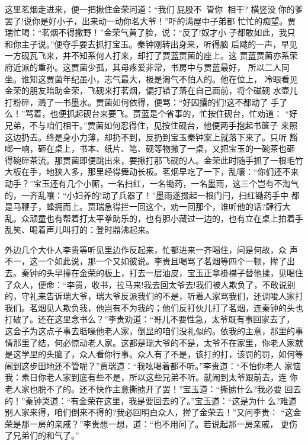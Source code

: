 这里茗烟走进来，便一把揪住金荣问道：“我们屁股不，管你相干?
横竖没你的爹罢了!说你是好小子，出来动一动你茗大爷！”吓的满屋中子弟都
忙忙的痴望。贾瑞忙喝：“茗烟不得撒野！”金荣气黄了脸，说：“反了!奴才小
子都敢如此，我只和你主子说。”便夺手要去抓打宝玉。秦钟刚转出身来，听得脑
后飕的一声，早见一方砚瓦飞来，并不知系何人打来，却打了贾蓝贾菌的座上。这
贾蓝贾菌亦系荣府近派的重孙。这贾菌少孤，其母疼爱非常，书房中与贾蓝最好，
所以二人同坐。谁知这贾菌年纪虽小，志气最大，极是淘气不怕人的。他在位上，
冷眼看见金荣的朋友暗助金荣，飞砚来打茗烟，偏打错了落在自己面前，将个磁砚
水壶儿打粉碎，溅了一书墨水。贾菌如何依得，便骂：“好囚攮的们!这不都动了
手了么！”骂着，也便抓起砚台来要飞。贾蓝是个省事的，忙按住砚台，忙劝道：
“好兄弟，不与咱们相干。”贾菌如何忍得住，见按住砚台，他便两手抱起书箧子
来照这边扔去。终是身小力薄，却扔不到，反扔到宝玉秦钟案上就落下来了。只听
豁啷一响，砸在桌上，书本、纸片、笔、砚等物撒了一桌，又把宝玉的一碗茶也砸
得碗碎茶流。那贾菌即便跳出来，要揪打那飞砚的人。金荣此时随手抓了一根毛竹
大板在手，地狭人多，那里经得舞动长板。茗烟早吃了一下，乱嚷：“你们还不来
动手？”宝玉还有几个小厮，一名扫红，一名锄药，一名墨雨，这三个岂有不淘气
的，一齐乱嚷：“小妇养的!动了兵器了！”墨雨遂掇起一根门闩，扫红锄药手中
都是马鞭子，蜂拥而上。贾瑞急得拦一回这个，劝一回那个，谁听他的话?肆行大
乱。众顽童也有帮着打太平拳助乐的，也有胆小藏过一边的，也有立在桌上拍着手
乱笑、喝着声儿叫打的：登时鼎沸起来。

外边几个大仆人李贵等听见里边作反起来，忙都进来一齐喝住，问是何故，众
声不一，这一个如此说，那一个又如彼说。李贵且喝骂了茗烟等四个一顿，撵了出
去。秦钟的头早撞在金荣的板上，打去一层油皮，宝玉正拿褂襟子替他揉，见喝住
了众人，便命：“李贵，收书，拉马来!我去回太爷去!我们被人欺负了，不敢说别
的，守礼来告诉瑞大爷，瑞大爷反派我们的不是，听着人家骂我们，还调唆人家打
我们。茗烟见人欺负我，他岂有不为我的；他们反打伙儿打了茗烟，连秦钟的头也
打破了。还在这里念书么？”李贵劝道：“哥儿不要性急，太爷既有事回家去了，
这会子为这点子事去聒噪他老人家，倒显的咱们没礼似的。依我的主意，那里的事
情那里了结，何必惊动老人家。这都是瑞大爷的不是，太爷不在家里，你老人家就
是这学里的头脑了，众人看你行事。众人有了不是，该打的打，该罚的罚，如何等
闹到这步田地还不管呢？”贾瑞道：“我吆喝着都不听。”李贵道：“不怕你老人
家恼我：素日你老人家到底有些不是，所以这些兄弟不听。就闹到太爷跟前去，连
你老人家也脱不了的。还不快作主意撕掳开了罢！”宝玉道：“撕掳什么?我必要
回去的！”秦钟哭道：“有金荣在这里，我是要回去的了。”宝玉道：“这是为什
么?难道别人家来得，咱们倒来不得的?我必回明白众人，撵了金荣去！”又问李贵：
“这金荣是那一房的亲戚？”李贵想一想，道：“也不用问了。若说起那一房亲戚，
更伤了兄弟们的和气了。”

